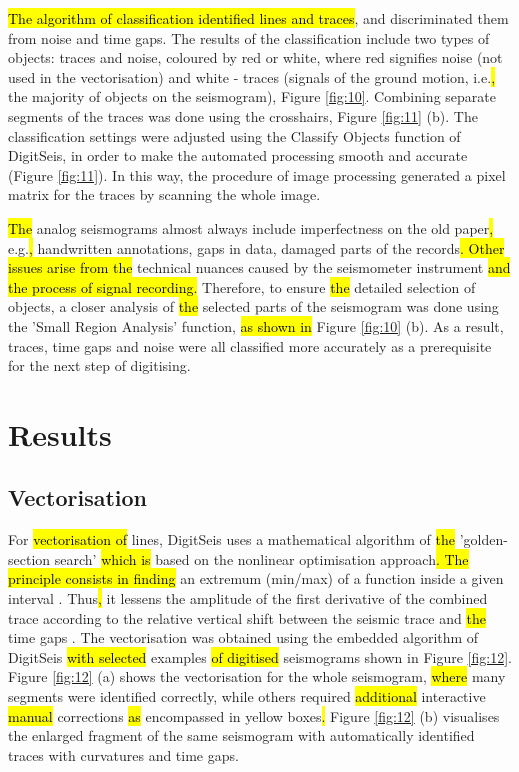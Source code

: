 \documentclass[sensors,article,submit,moreauthors,pdftex]{Definitions/mdpi}
\begin{document}
\hl{The algorithm of classification identified lines and traces}, and discriminated them from noise and time gaps. The results of the classification include two types of objects: traces and noise, coloured by red or white, where red signifies noise (not used in the vectorisation) and white - traces (signals of the ground motion, i.e.\hl{, }the majority of objects on the seismogram), Figure \ref{fig:10}. Combining separate segments of the traces was done using the crosshairs, Figure \ref{fig:11} (b). The classification settings were adjusted using the Classify Objects function of DigitSeis, in order to make the automated processing smooth and accurate (Figure \ref{fig:11}). In this way, the procedure of image processing generated a pixel matrix for the traces by scanning the whole image.  

\hl{The }analog seismograms almost always include imperfectness on the old paper\hl{, }e.g.\hl{, }handwritten annotations, gaps in data, damaged parts of the records\hl{. Other issues arise from the }technical nuances caused by the seismometer instrument\hl{ and the process of signal recording. }Therefore, to ensure \hl{the }detailed selection of objects, a closer analysis of \hl{the }selected parts of the seismogram was done using the 'Small Region Analysis' function, \hl{as shown in }Figure \ref{fig:10} (b). As a result, traces, time gaps\hl{ }and noise were all classified more accurately as a prerequisite for the next step of digitising. 

\section{Results}

\subsection{Vectorisation}

For \hl{vectorisation of} lines, DigitSeis uses a mathematical algorithm of \hl{the }'golden-section search' \hl{which is }based on the nonlinear optimisation approach\hl{. The principle consists in finding }an extremum (min/max) of a function inside a given interval \cite{Kiefer,Press}. Thus\hl{, }it lessens the amplitude of the first derivative of the combined trace according to the relative vertical shift between the seismic trace and \hl{the }time gaps \cite{BogiatzisIshii2016}. The vectorisation was obtained using the embedded algorithm of DigitSeis\hl{ with selected }examples\hl{ of digitised }seismograms\hl{ }shown in Figure \ref{fig:12}.\hl{ }Figure \ref{fig:12} (a) shows the vectorisation for the whole seismogram, \hl{where }many segments were identified correctly, while others required \hl{additional }interactive \hl{manual }corrections\hl{ as }encompassed in yellow boxes\hl{. }Figure \ref{fig:12} (b) visualises the enlarged fragment of the same seismogram with automatically identified traces with curvatures and time gaps. 
\end{document}
